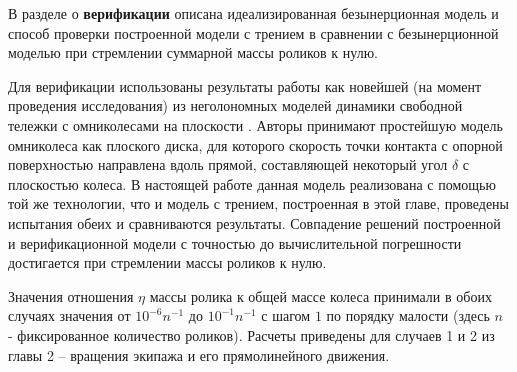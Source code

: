 
В разделе о \textbf{верификации} описана идеализированная безынерционная модель и способ проверки построенной модели с трением в сравнении с безынерционной моделью при стремлении суммарной массы роликов к нулю.

Для верификации использованы результаты работы \cite{Borisov2011} как новейшей (на момент проведения исследования) из неголономных моделей динамики свободной тележки с омниколесами на плоскости \cite{Borisov2011, formalskii, ZobovaTatarinovPMM}. Авторы \cite{Borisov2011} принимают простейшую модель омниколеса как плоского диска, для которого скорость точки контакта с опорной поверхностью направлена вдоль прямой, составляющей некоторый угол $\delta$ с плоскостью колеса.
В настоящей работе данная модель реализована с помощью той же технологии, что и модель с трением, построенная в этой главе, проведены испытания обеих и сравниваются результаты.
Совпадение решений построенной и верификационной модели с точностью до вычислительной погрешности достигается при стремлении массы роликов к нулю.

Значения отношения $\eta$ массы ролика к общей массе колеса принимали в обоих случаях значения от $10^{-6}n^{-1}$ до $10^{-1}n^{-1}$ с шагом $1$ по порядку малости (здесь $n$ - фиксированное количество роликов).
Расчеты приведены для случаев 1 и 2 из главы 2 -- вращения экипажа и его прямолинейного движения.


